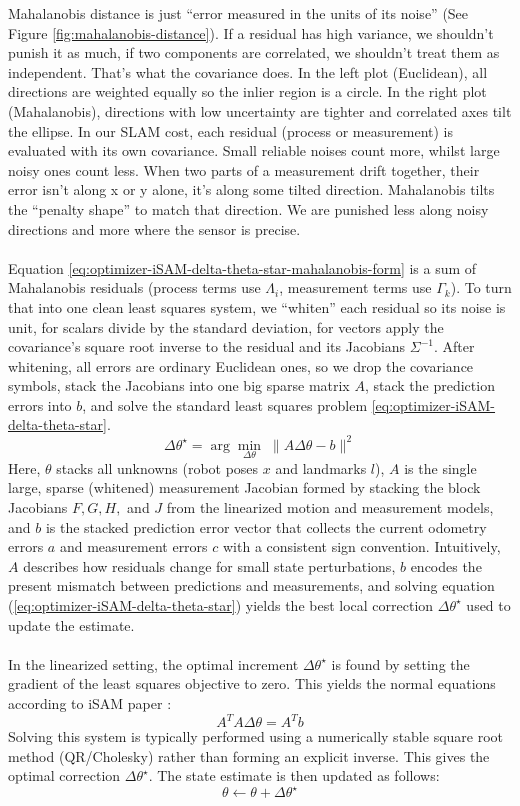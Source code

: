 \noindent
Mahalanobis distance is just ``error measured in the units of its noise'' (See Figure \ref{fig:mahalanobis-distance}). If a residual has high variance, we shouldn't punish it as much, if two components are correlated, we shouldn't treat them as independent. That's what the covariance does. In the left plot (Euclidean), all directions are weighted equally so the inlier region is a circle. In the right plot (Mahalanobis), directions with low uncertainty are tighter and correlated axes tilt the ellipse. In our SLAM cost, each residual (process or measurement) is evaluated with its own covariance. Small reliable noises count more, whilst large noisy ones count less. When two parts of a measurement drift together, their error isn't along x or y alone, it's along some tilted direction. Mahalanobis tilts the ``penalty shape'' to match that direction. We are punished less along noisy directions and more where the sensor is precise.
\\ \\
Equation \eqref{eq:optimizer-iSAM-delta-theta-star-mahalanobis-form} is a sum of Mahalanobis residuals (process terms use $\Lambda_i$, measurement terms use $\Gamma_k$). To turn that into one clean least squares system, we ``whiten'' each residual so its noise is unit, for scalars divide by the standard deviation, for vectors apply the covariance's square root inverse to the residual and its Jacobians $\Sigma^{-1}$. After whitening, all errors are ordinary Euclidean ones, so we drop the covariance symbols, stack the Jacobians into one big sparse matrix $A$, stack the prediction errors into $b$, and solve the standard least squares problem \eqref{eq:optimizer-iSAM-delta-theta-star}.
\begin{equation}
    \Delta\theta^\star = \arg\min_{\Delta\theta}\; \|A\Delta\theta - b\|^2
    \label{eq:optimizer-iSAM-delta-theta-star}
\end{equation}
Here, $\theta$ stacks all unknowns (robot poses $x$ and landmarks $l$), $A$ is the single large, sparse (whitened) measurement Jacobian formed by stacking the block Jacobians $F, G, H,$ and $J$ from the linearized motion and measurement models, and $b$ is the stacked prediction error vector that collects the current odometry errors $a$ and measurement errors $c$ with a consistent sign convention. Intuitively, $A$ describes how residuals change for small state perturbations, $b$ encodes the present mismatch between predictions and measurements, and solving equation (\ref{eq:optimizer-iSAM-delta-theta-star}) yields the best local correction $\Delta\theta^\star$ used to update the estimate.
\\ \\
In the linearized setting, the optimal increment $\Delta\theta^\star$ is found by setting the gradient of the least squares objective to zero. This yields the normal equations according to iSAM paper \cite{iSAM_paper}:
$$
    A^{T}A\Delta\theta = A^{T}b
$$
Solving this system is typically performed using a numerically stable square root method (QR/Cholesky) rather than forming an explicit inverse. This gives the optimal correction $\Delta\theta^\star$. The state estimate is then updated as follows:
$$
    \theta \leftarrow \theta + \Delta\theta^\star
$$



